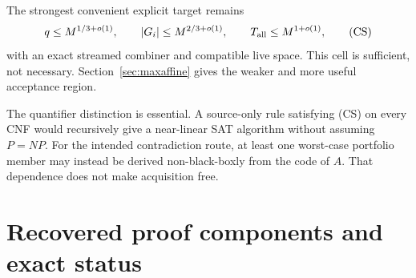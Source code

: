 \documentclass[11pt]{article}
\begin{document}
The strongest convenient explicit target remains
\begin{equation*}
 q\le M^{1/3+o(1)},\qquad
 |G_i|\le M^{2/3+o(1)},\qquad
 T_{\rm all}\le M^{1+o(1)},
 \tag{CS}
\end{equation*}
with an exact streamed combiner and compatible live space.  This cell is
sufficient, not necessary.  Section~\ref{sec:maxaffine} gives the weaker and
more useful acceptance region.

The quantifier distinction is essential.  A source-only rule satisfying
(CS) on every CNF would recursively give a near-linear SAT algorithm without
assuming $P=NP$.  For the intended contradiction route, at least one
worst-case portfolio member may instead be derived non-black-boxly from the
code of $A$.  That dependence does not make acquisition free.

\section{Recovered proof components and exact status}
\end{document}
